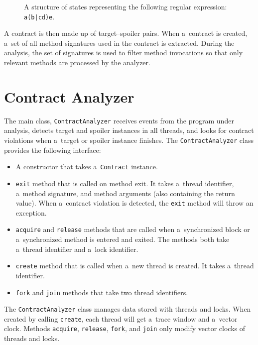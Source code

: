 \begin{figure}[hbt]
    \begin{center}
        \label{states}
        
        \caption{A structure of states representing the following regular
        expression: \texttt{a(b|cd)e}.}
    \end{center}
\end{figure}

A contract is then made up of target--spoiler pairs. When a~contract is created,
a~set of all method signatures used in the contract is extracted. During the
analysis, the set of signatures is used to filter method invocations so that
only relevant methods are processed by the analyzer.

\section{Contract Analyzer}
\label{contractAnalyzer}
The main class, \texttt{ContractAnalyzer} receives events from the program under
analysis, detects target and spoiler instances in all threads, and looks for
contract violations when a~target or spoiler instance finishes. The
\texttt{ContractAnalyzer} class provides the following interface:
\begin{itemize}
    \item A constructor that takes a~\texttt{Contract} instance.
    \item \texttt{exit} method that is called on method exit. It takes a~thread
        identifier, a~method signature, and method arguments (also containing
        the return value). When a~contract violation is detected, the
        \texttt{exit} method will throw an exception.
    \item \texttt{acquire} and \texttt{release} methods that are called when
        a~synchronized block or a~synchronized method is entered and exited. The
        methods both take a~thread identifier and a~lock identifier.
    \item \texttt{create} method that is called when a~new thread is created. It
        takes a~thread identifier.
    \item \texttt{fork} and \texttt{join} methods that take two thread
        identifiers.
\end{itemize}

The \texttt{ContractAnalyzer} class manages data stored with threads and locks.
When created by calling \texttt{create}, each thread will get a~trace window and
a~vector clock. Methods \texttt{acquire}, \texttt{release}, \texttt{fork}, and
\texttt{join} only modify vector clocks of threads and locks.

